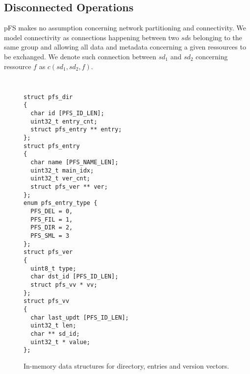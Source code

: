 \documentclass[letterpaper,twocolumn,10pt]{article}
\begin{document}
\subsection{Disconnected Operations}

pFS makes no assumption concerning network partitioning and
connectivity. We model connectivity as connections happening between
two $sd$s belonging to the same group and allowing all data and
metadata concerning a given ressources to be exchanged. We denote such
connection between $sd_{1}$ and $sd_{2}$ concerning ressource $f$ as
$c(sd_{1}, sd_{2}, f)$.

\begin{figure}[t]
\begin{center}
{\tt \small
\begin{verbatim}
struct pfs_dir
{
  char id [PFS_ID_LEN];
  uint32_t entry_cnt;
  struct pfs_entry ** entry;
};
struct pfs_entry
{
  char name [PFS_NAME_LEN];
  uint32_t main_idx;
  uint32_t ver_cnt; 
  struct pfs_ver ** ver;
};
enum pfs_entry_type {
  PFS_DEL = 0,
  PFS_FIL = 1,
  PFS_DIR = 2,
  PFS_SML = 3 
};
struct pfs_ver
{
  uint8_t type;
  char dst_id [PFS_ID_LEN];
  struct pfs_vv * vv;
};
struct pfs_vv
{ 
  char last_updt [PFS_ID_LEN];
  uint32_t len;
  char ** sd_id;
  uint32_t * value;
};
\end{verbatim}
}
\end{center}
\caption{In-memory data structures for directory, entries and version vectors.}
\end{figure}
\end{document}
